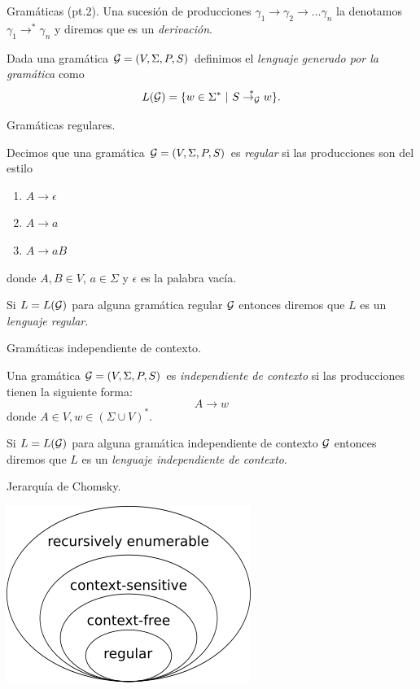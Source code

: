 \documentclass[aspectratio=169, 11pt]{beamer}
\begin{document}
	\begin{frame}[fragile]{Gramáticas (pt.2).}
		Una sucesión de producciones $\gamma_{1} \to \gamma_{2} \to \dots \gamma_{n}$ la denotamos $\gamma_{1} \to^{*} \gamma_{n}$ y diremos que es un \emph{derivación}.

		\begin{deff}
			Dada una gramática ${\cal G} = (V, \Sigma, P, S)$  definimos el \emph{lenguaje generado por la gramática} como
			\[
			L({\cal G}) = \{ w \in \Sigma^* \ | \ S \overset{*}{\to_{\cal G}} w   \}.
			\]
		\end{deff}		
	\end{frame}

	\begin{frame}{Gramáticas regulares.}
		\begin{deff}
			Decimos que una gramática ${\cal G} = (V, \Sigma, P, S)$ es \emph{regular} si las producciones son del estilo
	\begin{enumerate}
		\item $A \to \epsilon$
		\item $A \to a$
		\item $A \to a B$
	\end{enumerate}
	donde $A, B \in V$, $a \in \Sigma$ y $\epsilon$ es la palabra vacía. 

	Si $L=L({\cal G})$ para alguna gramática regular $\cal G$ entonces diremos que $L$ es un \emph{lenguaje regular}.
		\end{deff}
	\end{frame}

	\begin{frame}{Gramáticas independiente de contexto.}
		\begin{deff}
			Una gramática ${\cal G} = (V, \Sigma, P, S) $ es \emph{independiente de contexto} si las producciones tienen la siguiente forma:
			\begin{equation*}
				A \to w
			\end{equation*}
			donde $A \in V, w \in (\Sigma \cup V)^*$.  
			
			Si $L=L({\cal G})$ para alguna gramática independiente de contexto $\cal G$ entonces diremos que $L$ es un \emph{lenguaje independiente de contexto}.

		\end{deff}
		
	\end{frame}

	\begin{frame}{Jerarquía de Chomsky.}

			\centering
			\includegraphics[scale = 0.65]{Chomsky-hierarchy.png}
		
	\end{frame}
\end{document}
